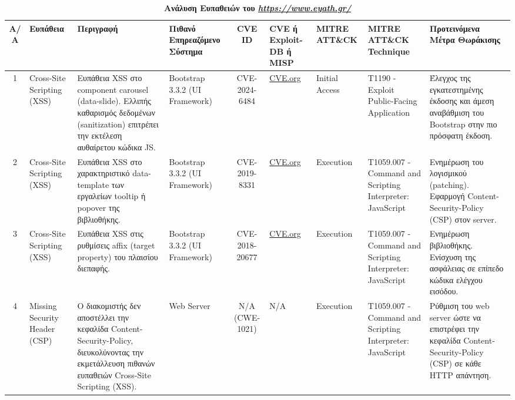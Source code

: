 \documentclass[12pt, a4paper]{article}
\begin{document}
\begin{landscape}
\begin{table}[ht]
\caption{\textbf{Ανάλυση Ευπαθειών του \textit{\href{https://www.eyath.gr/}{https://www.eyath.gr/}}}}
\label{tab:2}
\centering
\small
\renewcommand{\arraystretch}{1.5}
\begin{tabularx}{\linewidth}{|c|p{2.2cm}|X|p{2cm}|c|p{2.2cm}|p{2cm}|p{3.5cm}|X|}
\hline
\rowcolor{tablehead}
\textbf{Α/Α} & \textbf{Ευπάθεια} & \textbf{Περιγραφή} & \textbf{Πιθανό Επηρεαζόμενο Σύστημα} & \textbf{CVE ID} & \textbf{CVE ή Exploit-DB ή MISP} & \textbf{MITRE ATT\&CK} & \textbf{MITRE ATT\&CK Technique} & \textbf{Προτεινόμενα Μέτρα Θωράκισης} \\
\hline
1 & Cross-Site Scripting (XSS) & Ευπάθεια XSS στο component carousel (data-slide). Ελλιπής καθαρισμός δεδομένων (sanitization) επιτρέπει την εκτέλεση αυθαίρετου κώδικα JS. & Bootstrap 3.3.2 (UI Framework) & CVE-2024-6484 & \href{https://www.cve.org/CVERecord?id=CVE-2024-6484}{CVE.org} & Initial Access & T1190 - Exploit Public-Facing Application & Έλεγχος της εγκατεστημένης έκδοσης και άμεση αναβάθμιση του Bootstrap στην πιο πρόσφατη έκδοση. \\
\hline
2 & Cross-Site Scripting (XSS) & Ευπάθεια XSS στο χαρακτηριστικό data-template των εργαλείων tooltip ή popover της βιβλιοθήκης. & Bootstrap 3.3.2 (UI Framework) & CVE-2019-8331 & \href{https://www.cve.org/CVERecord?id=CVE-2019-8331}{CVE.org} & Execution & T1059.007 - Command and Scripting Interpreter: JavaScript & Ενημέρωση του λογισμικού (patching). Εφαρμογή Content-Security-Policy (CSP) στον server. \\
\hline
3 & Cross-Site Scripting (XSS) & Ευπάθεια XSS στις ρυθμίσεις affix (target property) του πλαισίου διεπαφής. & Bootstrap 3.3.2 (UI Framework) & CVE-2018-20677 & \href{https://www.cve.org/CVERecord?id=CVE-2018-20677}{CVE.org} & Execution & T1059.007 - Command and Scripting Interpreter: JavaScript & Ενημέρωση βιβλιοθήκης. Ενίσχυση της ασφάλειας σε επίπεδο κώδικα ελέγχου εισόδου. \\
\hline
4 & Missing Security Header (CSP) & Ο διακομιστής δεν αποστέλλει την κεφαλίδα Content-Security-Policy, διευκολύνοντας την εκμετάλλευση πιθανών ευπαθειών Cross-Site Scripting (XSS). & Web Server & N/A (CWE-1021) & N/A & Execution & T1059.007 - Command and Scripting Interpreter: JavaScript & Ρύθμιση του web server ώστε να επιστρέφει την κεφαλίδα Content-Security-Policy (CSP) σε κάθε HTTP απάντηση. \\
\hline
\end{tabularx}
\end{table}


\end{landscape}
\end{document}
